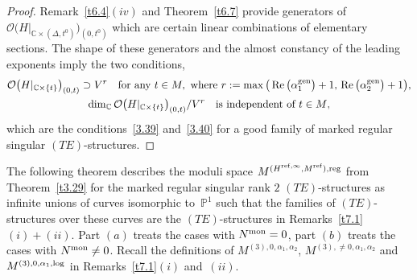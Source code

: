 \documentclass[pdftex]{sigma}%
\numberwithin{equation}{section}
\numberwithin{figure}{section}
\newcommand{\C}{{\mathbb C}}
\renewcommand{\P}{{\mathbb P}}
\newcommand{\OO}{{\mathcal O}}
\DeclareMathOperator{\Ree}{Re}
\begin{document}
\begin{proof}
Remark~\ref{t6.4}$(iv)$ and Theorem~\ref{t6.7}
provide generators of $\OO\big(H|_{\C\times(\Delta,t^0)}\big)_{(0,t^0)}$
which are certain linear combinations of elementary sections.
The shape of these generators and the almost constancy
of the leading exponents imply the two conditions,
\begin{gather*}%
\OO\big(H|_{\C\times\{t\}}\big)_{(0,t)}\supset V^r\quad
\text{for any}\ t\in M,
\ \text{where} \
r:=\max\big(\Ree\big(\alpha_1^{\rm gen}\big)+1,\,\Ree\big(\alpha_2^{\rm gen}\big)+1\big),\\
\dim_\C\OO\big(H|_{\C\times\{t\}}\big)_{(0,t)}/V^r \quad
\text{is independent of $t\in M$}, %
\end{gather*}
which are the conditions~\eqref{3.39} and~\eqref{3.40}
for a good family of marked regular singular
$(TE)$-structures.
\end{proof}


The following theorem describes the moduli space
$M^{(H^{{\rm ref},\infty},M^{\rm ref}),{\rm reg}}$ from Theorem~\ref{t3.29}
for the marked regular singular rank $2$ $(TE)$-structures as infinite
unions of curves isomorphic to~$\P^1$ such that the families of
$(TE)$-structures over these curves are the $(TE)$-structures
in Remarks~\ref{t7.1}$(i){+}(ii)$.
Part $(a)$ treats the cases with $N^{\rm mon}=0$,
part $(b)$ treats the cases with $N^{\rm mon}\neq 0$.
Recall the definitions of $M^{(3),0,\alpha_1,\alpha_2}$,
$M^{(3),\neq 0,\alpha_1,\alpha_2}$ and
$M^{(3),0,\alpha_1,{\rm log}}$ in Remarks~\ref{t7.1}$(i)$ and~$(ii)$.
\end{document}
